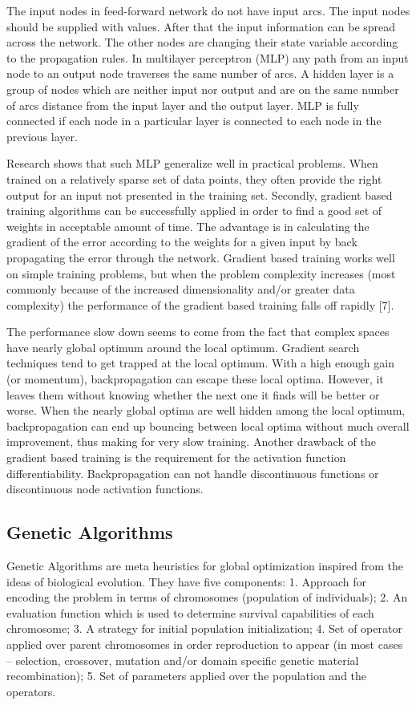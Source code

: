 \documentclass{llncs}
\begin{document}
The input nodes in feed-forward network do not have input arcs. The input nodes should be supplied with values. After that the input information can be spread across the network. The other nodes are changing their state variable according to the propagation rules. In multilayer perceptron (MLP) any path from an input node to an output node traverses the same number of arcs. A hidden layer is a group of nodes which are neither input nor output and are on the same number of arcs distance from the input layer and the output layer. MLP is fully connected if each node in a particular layer is connected to each node in the previous layer. 

Research shows that such MLP generalize well in practical problems. When trained on a relatively sparse set of data points, they often provide the right output for an input not presented in the training set. Secondly, gradient based training algorithms can be successfully applied in order to find a good set of weights in acceptable amount of time. The advantage is in calculating the gradient of the error according to the weights for a given input by back propagating the error through the network. Gradient based training works well on simple training problems, but when the problem complexity increases (most commonly because of the increased dimensionality and/or greater data complexity) the performance of the gradient based training falls off rapidly [7]. 

The performance slow down seems to come from the fact that complex spaces have nearly global optimum around the local optimum. Gradient search techniques tend to get trapped at the local optimum. With a high enough gain (or momentum), backpropagation can escape these local optima. However, it leaves them without knowing whether the next one it finds will be better or worse. When the nearly global optima are well hidden among the local optimum, backpropagation can end up bouncing between local optima without much overall improvement, thus making for very slow training. Another drawback of the gradient based training is the requirement for the activation function differentiability. Backpropagation can not handle discontinuous functions or discontinuous node activation functions.
%
\subsection{Genetic Algorithms}
%
Genetic Algorithms are meta heuristics for global optimization inspired from the ideas of biological evolution. They have five components: 1. Approach for encoding the problem in terms of chromosomes (population of individuals); 2. An evaluation function which is used to determine survival capabilities of each chromosome; 3. A strategy for initial population initialization; 4. Set of operator applied over parent chromosomes in order reproduction to appear (in most cases – selection, crossover, mutation and/or domain specific genetic material recombination); 5. Set of parameters applied over the population and the operators.
\end{document}
